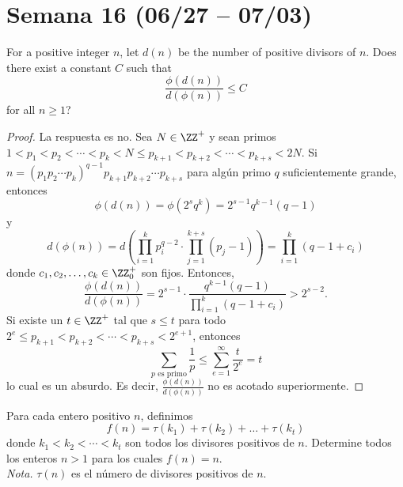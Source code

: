 \section{Semana 16 (06/27 -- 07/03)}


\begin{probHR}[ISL 2020/N6]
	For a positive integer $n$, let $d(n)$ be the number of positive divisors of $n$. Does there exist a constant $C$ such that
	\[\frac{\phi(d(n))}{d(\phi(n))}\le C\]
	for all $n\ge 1$?
\end{probHR}

\begin{proof}
	La respuesta es no. Sea $N\in\ZZ^+$ y sean primos $1<p_1<p_2<\cdots<p_k<N\le p_{k+1}<p_{k+2}<\cdots<p_{k+s}<2N$. Si $n=(p_1p_2\cdots p_k)^{q-1}p_{k+1}p_{k+2}\cdots p_{k+s}$ para algún primo $q$ suficientemente grande, entonces
	\[\phi(d(n))=\phi(2^sq^k)=2^{s-1}q^{k-1}(q-1)\]
	y
	\[d(\phi(n))=d\left(\prod_{i=1}^kp_i^{q-2}\cdot\prod_{j=1}^{k+s}(p_j-1)\right)=\prod_{i=1}^k(q-1+c_i)\]
	donde $c_1,c_2,\dots,c_k\in\ZZ^+_0$ son fijos. Entonces,
	\[\frac{\phi(d(n))}{d(\phi(n))}=2^{s-1}\cdot\frac{q^{k-1}(q-1)}{\prod_{i=1}^k(q-1+c_i)}>2^{s-2}.\]
	Si existe un $t\in\ZZ^+$ tal que $s\le t$ para todo $2^e\le p_{k+1}<p_{k+2}<\cdots<p_{k+s}<2^{e+1}$, entonces
	\[\sum_{p\text{ es primo}}\frac1p\le\sum_{e=1}^\infty\frac{t}{2^e}=t\]
	lo cual es un absurdo. Es decir, $\frac{\phi(d(n))}{d(\phi(n))}$ no es acotado superiormente.
\end{proof}


\begin{probEG}
	Para cada entero positivo $n$, definimos
	\[f(n)=\tau(k_1)+\tau(k_2)+\dots+\tau(k_t)\]
	donde $k_1<k_2<\cdots<k_t$ son todos los divisores positivos de $n$. Determine todos los enteros $n>1$ para los cuales $f(n)=n$.\\[4pt]
	\emph{Nota.} $\tau(n)$ es el número de divisores positivos de $n$.
\end{probEG}

